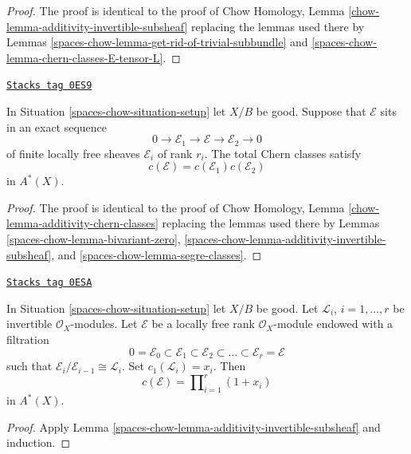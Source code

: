 \begin{proof}
The proof is identical to the proof of
Chow Homology, Lemma \ref{chow-lemma-additivity-invertible-subsheaf}
replacing the lemmas used there by
Lemmas
\ref{spaces-chow-lemma-get-rid-of-trivial-subbundle} and
\ref{spaces-chow-lemma-chern-classes-E-tensor-L}.
\end{proof}

\begin{lemma}
\label{spaces-chow-lemma-additivity-chern-classes}
\href{https://stacks.math.columbia.edu/tag/0ES9}{\texttt{Stacks tag 0ES9}}

In Situation \ref{spaces-chow-situation-setup} let $X/B$ be good.
Suppose that $\mathcal{E}$ sits in an exact sequence
$$
0
\to
\mathcal{E}_1
\to
\mathcal{E}
\to
\mathcal{E}_2
\to
0
$$
of finite locally free sheaves $\mathcal{E}_i$ of rank $r_i$.
The total Chern classes satisfy
$$
c(\mathcal{E}) = c(\mathcal{E}_1) c(\mathcal{E}_2)
$$
in $A^*(X)$.
\end{lemma}

\begin{proof}
The proof is identical to the proof of
Chow Homology, Lemma \ref{chow-lemma-additivity-chern-classes}
replacing the lemmas used there by
Lemmas \ref{spaces-chow-lemma-bivariant-zero},
\ref{spaces-chow-lemma-additivity-invertible-subsheaf}, and
\ref{spaces-chow-lemma-segre-classes}.
\end{proof}

\begin{lemma}
\label{spaces-chow-lemma-chern-filter-by-linebundles}
\href{https://stacks.math.columbia.edu/tag/0ESA}{\texttt{Stacks tag 0ESA}}

In Situation \ref{spaces-chow-situation-setup} let $X/B$ be good.
Let ${\mathcal L}_i$, $i = 1, \ldots, r$ be invertible
$\mathcal{O}_X$-modules.
Let $\mathcal{E}$ be a locally free rank
$\mathcal{O}_X$-module endowed with a filtration
$$
0 = \mathcal{E}_0 \subset \mathcal{E}_1 \subset \mathcal{E}_2
\subset \ldots \subset \mathcal{E}_r = \mathcal{E}
$$
such that $\mathcal{E}_i/\mathcal{E}_{i - 1} \cong \mathcal{L}_i$.
Set $c_1({\mathcal L}_i) = x_i$. Then
$$
c(\mathcal{E})
=
\prod\nolimits_{i = 1}^r (1 + x_i)
$$
in $A^*(X)$.
\end{lemma}

\begin{proof}
Apply Lemma \ref{spaces-chow-lemma-additivity-invertible-subsheaf} and induction.
\end{proof}

